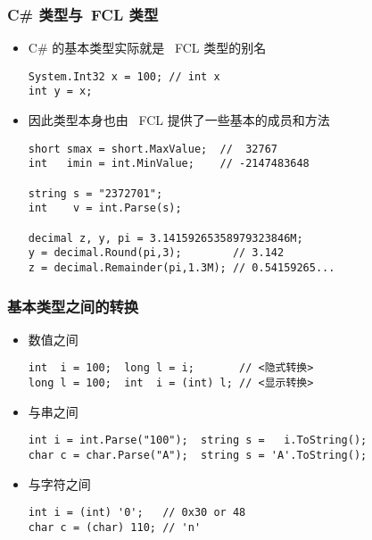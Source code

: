\begin{frame}[fragile]
\frametitle{C\# 类型与~FCL 类型}
\begin{itemize}
\item C\# 的基本类型实际就是 ~FCL 类型的别名
\begin{lstlisting}
System.Int32 x = 100; // int x
int y = x;
\end{lstlisting}
\pause
\item 因此类型本身也由 ~FCL 提供了一些基本的成员和方法

\begin{lstlisting}
short smax = short.MaxValue;  //  32767
int   imin = int.MinValue;    // -2147483648

string s = "2372701";
int    v = int.Parse(s);

decimal z, y, pi = 3.14159265358979323846M;
y = decimal.Round(pi,3);        // 3.142
z = decimal.Remainder(pi,1.3M); // 0.54159265...

\end{lstlisting}
\end{itemize}
\end{frame}

\begin{frame}[fragile]
\frametitle{基本类型之间的转换}
\begin{itemize}
\item 数值之间
\begin{lstlisting}[escapeinside=<>]
int  i = 100;  long l = i;       // <隐式转换>
long l = 100;  int  i = (int) l; // <显示转换>
\end{lstlisting}
\pause
\item 与串之间
\begin{lstlisting}
int i = int.Parse("100");  string s =   i.ToString();
char c = char.Parse("A");  string s = 'A'.ToString();
\end{lstlisting}
\pause
\item 与字符之间
\begin{lstlisting}
int i = (int) '0';   // 0x30 or 48
char c = (char) 110; // 'n'
\end{lstlisting}
\end{itemize}
\end{frame}

